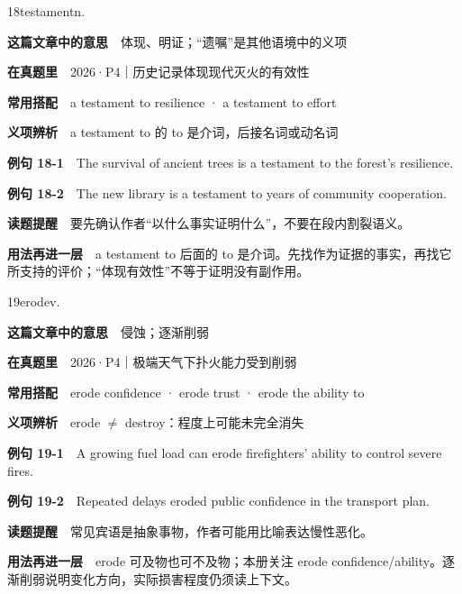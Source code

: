 \documentclass[a4paper,11pt,openany]{report}
\newcommand{\emphasislabel}[1]{\textcolor{leaf}{\CJKsf\bfseries #1}}
\begin{document}
\begin{vocabbox}{18}{testament}{n.}

\textbf{这篇文章中的意思}　体现、明证；``遗嘱''是其他语境中的义项

\textbf{在真题里}　2026·P4｜历史记录体现现代灭火的有效性

\textbf{常用搭配}　a testament to resilience · a testament to effort

\textbf{义项辨析}　a testament to 的 to 是介词，后接名词或动名词

\textbf{例句 18-1}　The survival of ancient trees is a testament to the forest's resilience.

\textbf{例句 18-2}　The new library is a testament to years of community cooperation.

\emphasislabel{读题提醒}　要先确认作者``以什么事实证明什么''，不要在段内割裂语义。

\textbf{用法再进一层}　a testament to 后面的 to 是介词。先找作为证据的事实，再找它所支持的评价；``体现有效性''不等于证明没有副作用。

\end{vocabbox}

\begin{vocabbox}{19}{erode}{v.}

\textbf{这篇文章中的意思}　侵蚀；逐渐削弱

\textbf{在真题里}　2026·P4｜极端天气下扑火能力受到削弱

\textbf{常用搭配}　erode confidence · erode trust · erode the ability to

\textbf{义项辨析}　erode \(\neq\) destroy：程度上可能未完全消失

\textbf{例句 19-1}　A growing fuel load can erode firefighters' ability to control severe fires.

\textbf{例句 19-2}　Repeated delays eroded public confidence in the transport plan.

\emphasislabel{读题提醒}　常见宾语是抽象事物，作者可能用比喻表达慢性恶化。

\textbf{用法再进一层}　erode 可及物也可不及物；本册关注 erode confidence/ability。逐渐削弱说明变化方向，实际损害程度仍须读上下文。

\end{vocabbox}
\end{document}
